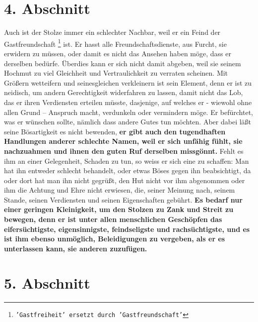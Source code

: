 \section{4. Abschnitt} \label{kap12_ab4}

Auch ist der Stolze immer ein schlechter Nachbar, weil er ein Feind der
Gastfreundschaft
\footnote{\texttt{'Gastfreiheit' ersetzt durch 'Gastfreundschaft'}}
 ist. Er hasst alle
Freundschaftsdienste, aus Furcht, sie erwidern
zu müssen, oder damit es nicht das Ansehen haben möge, dass er derselben bedürfe.
Überdies kann er sich nicht damit abgeben, weil sie seinem Hochmut zu viel
Gleichheit und Vertraulichkeit zu verraten scheinen. Mit
Größern wetteifern und
seinesgleichen verkleinern ist sein Element, denn er ist zu neidisch, um
andern Gerechtigkeit widerfahren zu lassen, damit nicht das Lob, das
er ihren
Verdiensten erteilen müsste, dasjenige, auf welches er - wiewohl ohne allen
Grund -- Anspruch macht, verdunkeln oder vermindern möge. Er befürchtet, was er
wünschen sollte, nämlich dass andere Gutes tun möchten. Aber dabei läßt seine
Bösartigkeit es nicht bewenden, \label{ref:12_04_eitle_menschen_tugent}
\textbf{er gibt auch den tugendhaften Handlungen
anderer schlechte Namen, weil er sich unfähig fühlt, sie nachzuahmen und ihnen
den guten Ruf derselben missgönnt.} Fehlt es ihm an einer Gelegenheit, Schaden zu
tun, so weiss er sich eine zu schaffen: Man hat ihn entweder schlecht behandelt,
oder etwas Böses gegen ihn beabsichtigt, da oder dort hat man ihn nicht gegrüßt,
den Hut nicht vor ihm abgenommen oder ihm die Achtung und Ehre nicht erwiesen,
die, seiner Meinung nach, seinem Stande, seinen Verdiensten und seinen
Eigenschaften gebührt. \label{ref:12_04_eitle_menschen_beleidigung}
\textbf{Es bedarf nur einer geringen Kleinigkeit, um den
Stolzen
zu Zank und Streit zu bewegen, denn er ist unter allen
menschlichen Geschöpfen
das eifersüchtigste, eigensinnigste, feindseligste und rachsüchtigste, und es
ist ihm ebenso unmöglich, Beleidigungen zu vergeben, als er es unterlassen kann,
sie anderen zuzufügen.}

\section{5. Abschnitt} \label{kap12_ab5}


